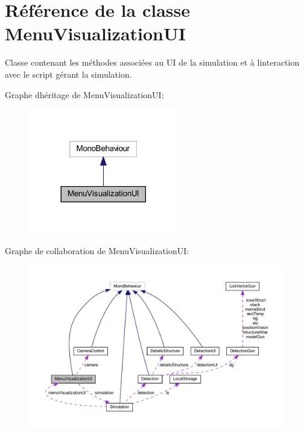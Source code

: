\hypertarget{class_menu_visualization_u_i}{}\section{Référence de la classe Menu\+Visualization\+UI}
\label{class_menu_visualization_u_i}


Classe contenant les méthodes associées au UI de la simulation et à l\textquotesingle{}interaction avec le script gérant la simulation.  




Graphe d\textquotesingle{}héritage de Menu\+Visualization\+UI\+:\nopagebreak
\begin{figure}[H]
\begin{center}
\leavevmode
\includegraphics[width=185pt]{class_menu_visualization_u_i__inherit__graph}
\end{center}
\end{figure}


Graphe de collaboration de Menu\+Visualization\+UI\+:
\nopagebreak
\begin{figure}[H]
\begin{center}
\leavevmode
\includegraphics[width=350pt]{class_menu_visualization_u_i__coll__graph}
\end{center}
\end{figure}
